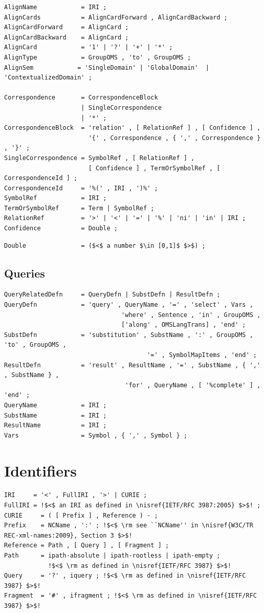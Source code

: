 \documentclass[10pt,fleqn,%
\ifpretendfinal
final%
\else
draft%
\fi,
]{scrreprt}
\newcommand{\sclause}[1]{\section{#1}}
\newcommand{\ssclause}[1]{\subsection{#1}}
\newcommand{\nisref}[1]{#1}
\begin{document}
\begin{lstlisting}[language=ebnf,mathescape]
AlignName            = IRI ;
AlignCards           = AlignCardForward , AlignCardBackward ;
AlignCardForward     = AlignCard ;
AlignCardBackward    = AlignCard ;
AlignCard            = '1' | '?' | '+' | '*' ;
AlignType            = GroupOMS , 'to' , GroupOMS ;
AlignSem            = 'SingleDomain' | 'GlobalDomain'  | 'ContextualizedDomain' ;

Correspondence       = CorrespondenceBlock
                     | SingleCorrespondence
                     | '*' ;
CorrespondenceBlock  = 'relation' , [ RelationRef ] , [ Confidence ] , 
                       '{' , Correspondence , { ',' , Correspondence } , '}' ;
SingleCorrespondence = SymbolRef , [ RelationRef ] ,
                       [ Confidence ] , TermOrSymbolRef , [ CorrespondenceId ] ;
CorrespondenceId     = '%(' , IRI , ')%' ;
SymbolRef            = IRI ;
TermOrSymbolRef      = Term | SymbolRef ;
RelationRef          = '>' | '<' | '=' | '%' | 'ni' | 'in' | IRI ;
Confidence           = Double ; 
\end{lstlisting}
\begin{lstlisting}[language=ebnf,escapeinside={()}]
Double               = ($<$ a number $\in [0,1]$ $>$) ;
\end{lstlisting}

\ssclause{Queries}

\begin{lstlisting}[language=ebnf,escapeinside={<>},mathescape]
QueryRelatedDefn     = QueryDefn | SubstDefn | ResultDefn ;
QueryDefn            = 'query' , QueryName , '=' , 'select' , Vars , 
                                'where' , Sentence , 'in' , GroupOMS , 
                                ['along' , OMSLangTrans] , 'end' ;
SubstDefn            = 'substitution' , SubstName , ':' , GroupOMS , 'to' , GroupOMS , 
                                       '=' , SymbolMapItems , 'end' ;
ResultDefn           = 'result' , ResultName , '=' , SubstName , { ',' , SubstName } ,
                                 'for' , QueryName , [ '%complete' ] , 'end' ;
QueryName            = IRI ;
SubstName            = IRI ;
ResultName           = IRI ;
Vars                 = Symbol , { ',' , Symbol } ;
\end{lstlisting}

\sclause{Identifiers}

\begin{lstlisting}[language=ebnf,escapeinside={!!}]
IRI     = '<' , FullIRI , '>' | CURIE ;
FullIRI = !$<$ an IRI as defined in \nisref{IETF/RFC 3987:2005} $>$! ;
CURIE     = ( [ Prefix ] , Reference ) - ;
Prefix    = NCName , ':' ; !$<$ \rm see ``NCName'' in \nisref{W3C/TR REC-xml-names:2009}, Section 3 $>$! 
Reference = Path , [ Query ] , [ Fragment ] ;
Path      = ipath-absolute | ipath-rootless | ipath-empty ;
            !$<$ \rm as defined in \nisref{IETF/RFC 3987} $>$! 
Query     = '?' , iquery ; !$<$ \rm as defined in \nisref{IETF/RFC 3987} $>$! 
Fragment  = '#' , ifragment ; !$<$ \rm as defined in \nisref{IETF/RFC 3987} $>$! 
\end{lstlisting}
\end{document}

